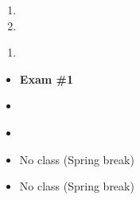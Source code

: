 \documentclass{article}
\begin{document}
%

\dia{}
\begin{enumerate}
\item {}
\item {}
\end{enumerate}

\dia{}
\begin{enumerate}
\item {}
\end{enumerate}

\week{}
\dia{}
\Review{}
\dia{}
\begin{itemize}
\item[ ] \textbf{Exam \#1}
\end{itemize}



\week{}
\dia{}
\begin{itemize}
\item {}
\end{itemize}

\dia{}
\begin{itemize}
\item {}
\end{itemize}

\week{}
\dia{}
\begin{itemize}
\item[ ] No class (Spring break)
\end{itemize}
\dia{}
\begin{itemize}
\item[ ] No class (Spring break)
\end{itemize}
\end{document}
